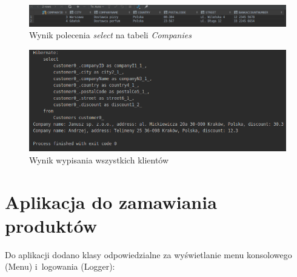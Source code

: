 \documentclass[12pt, a4paper]{mwart}
\begin{document}
\begin{figure}[ht]
  \centering
  \includegraphics[scale=0.5]{XI/11-11.png}
  \caption{Wynik polecenia \textit{select} na tabeli \textit{Companies}}
  \label{rys:11.11}
\end{figure}

\begin{figure}[ht]
  \centering
  \includegraphics[scale=0.5]{XI/11-12.png}
  \caption{Wynik wypisania wszystkich klientów}
  \label{rys:11.12}
\end{figure}

\clearpage
\section{Aplikacja do zamawiania produktów}

Do aplikacji dodano klasy odpowiedzialne za wyświetlanie menu konsolowego (Menu) i~logowania (Logger):
\end{document}
